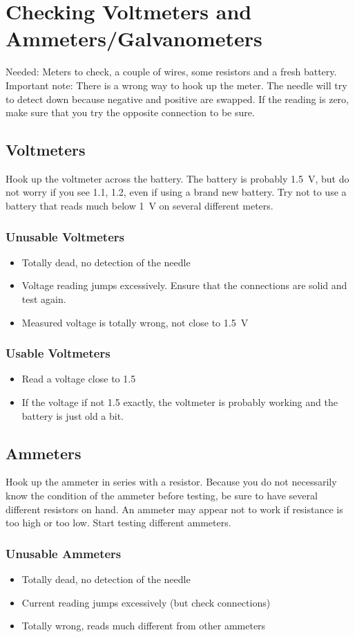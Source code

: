 \chapter{Checking Voltmeters and Ammeters/Galvanometers}
Needed: Meters to check, a couple of wires, some resistors and a fresh battery.  
Important note: There is a wrong way to hook up the meter. The needle will
try to detect down because negative and positive are swapped. If the reading
is zero, make sure that you try the opposite connection to be sure.  
\section{Voltmeters}
Hook up the voltmeter across the battery. The battery is probably 1.5~V, but
do not worry if you see 1.1, 1.2, even if using a brand new battery. Try not to
use a battery that reads much below 1~V on several different meters.  
\subsection{Unusable Voltmeters}
\begin{itemize}
\item{Totally dead, no detection of the needle}
\item{Voltage reading jumps excessively. Ensure that the connections are solid
and test again.}
\item{Measured voltage is totally wrong, not close to 1.5~V}
\end{itemize}
\subsection{Usable Voltmeters}
\begin{itemize}
\item{Read a voltage close to 1.5}
\item{If the voltage if not 1.5 exactly, the voltmeter is probably working and the battery is just old a bit.}  
\end{itemize}

\section{Ammeters}
Hook up the ammeter in series with a resistor. Because you do not necessarily
know the condition of the ammeter before testing, be sure to have several different
resistors on hand. An ammeter may appear not to work if resistance is
too high or too low. Start testing different ammeters.  
\subsection{Unusable Ammeters}
\begin{itemize}
\item{Totally dead, no detection of the needle}
\item{Current reading jumps excessively (but check connections)}
\item{Totally wrong, reads much different from other ammeters}
\end{itemize}

